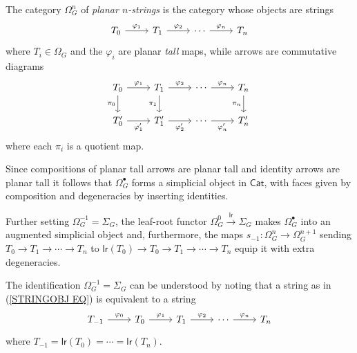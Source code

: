 \documentclass[a4paper,10pt]{article}%
\begin{document}
\begin{definition}\label{PLANSTR DEF}
	The category $\Omega_{G}^n$ of 
	\textit{planar $n$-strings} is the category whose objects are strings
\begin{equation}\label{STRINGOBJ EQ}
	\begin{tikzcd}
	T_0 \ar{r}{\varphi_1} & T_1 \ar{r}{\varphi_2} & \cdots \ar{r}{\varphi_n} & T_n
	\end{tikzcd}	
\end{equation}
	where $T_i \in \Omega_G$ and the $\varphi_i$ are planar \textit{tall} maps, while arrows are commutative diagrams 
	\begin{equation} \label{PTNARROW EQ}
	\begin{tikzcd}
	T_0 \ar{r}{\varphi_1} \ar{d}[swap]{\pi_0} & T_1 \ar{r}{\varphi_2} \ar{d}[swap]{\pi_1} & \cdots \ar{r}{\varphi_n} & T_n \ar{d}[swap]{\pi_n}
\\
	T'_0 \ar{r}[swap]{\varphi'_1} & T'_1 \ar{r}[swap]{\varphi'_2} & \cdots \ar{r}[swap]{\varphi'_n} & T'_n
	\end{tikzcd}	
	\end{equation}
where each $\pi_i$ is a quotient map.
\end{definition}


\begin{notation}\label{SIMPOPERATORS NOT}
	Since compositions of planar tall arrows are planar tall
	and identity arrows are planar tall	
	it follows that 
	$\Omega_{G}^{\bullet}$
	forms a simplicial object in $\mathsf{Cat}$, 
	with faces given by composition and degeneracies by inserting identities. 

	Further setting 
	$\Omega_{G}^{-1} = \Sigma_G$, the leaf-root functor $\Omega_{G}^{0} \xrightarrow{\mathsf{lr}} \Sigma_G$ makes 
	$\Omega_{G}^{\bullet}$ into an augmented simplicial object and, furthermore, the maps 
	$s_{-1} \colon \Omega_{G}^{n} \to \Omega_{G}^{n+1}$
sending $T_0 \to T_1 \to \cdots \to T_n$ to 
$\mathsf{lr}(T_0) \to T_0 \to T_1 \to \cdots \to T_n$ equip it with extra degeneracies.
\end{notation}


\begin{remark}
The identification $\Omega_{G}^{-1} = \Sigma_G$ can be understood by noting that a string as in (\ref{STRINGOBJ EQ}) is equivalent to a string
\begin{equation}\label{STRINGOBJALT EQ}
	\begin{tikzcd}
	T_{-1} \ar{r}{\varphi_0} & T_0 \ar{r}{\varphi_1} & T_1 \ar{r}{\varphi_2} & \cdots \ar{r}{\varphi_n} & T_n
	\end{tikzcd}	
\end{equation}
where $T_{-1} = \mathsf{lr}(T_0) = \cdots = \mathsf{lr}(T_n)$.
\end{remark}
\end{document}
